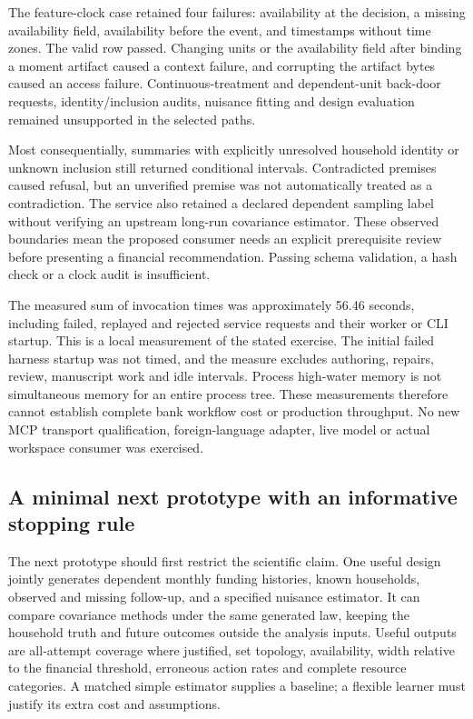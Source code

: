 The feature-clock case retained four failures: availability at the decision,
a missing availability field, availability before the event, and timestamps
without time zones. The valid row passed. Changing units or the availability
field after binding a moment artifact caused a context failure, and corrupting
the artifact bytes caused an access failure. Continuous-treatment and
dependent-unit back-door requests, identity/inclusion audits, nuisance fitting
and design evaluation remained unsupported in the selected paths.

Most consequentially, summaries with explicitly unresolved household identity
or unknown inclusion still returned conditional intervals. Contradicted
premises caused refusal, but an unverified premise was not automatically
treated as a contradiction. The service also retained a declared dependent
sampling label without verifying an upstream long-run covariance estimator.
These observed boundaries mean the proposed consumer needs an explicit
prerequisite review before presenting a financial recommendation. Passing
schema validation, a hash check or a clock audit is insufficient.

The measured sum of invocation times was approximately 56.46 seconds, including
failed, replayed and rejected service requests and their worker or CLI startup.
This is a local measurement of the stated exercise. The initial failed
harness startup was not timed, and the measure excludes authoring, repairs,
review, manuscript work and idle intervals. Process high-water memory is not
simultaneous memory for an entire process tree. These measurements therefore
cannot establish complete bank workflow cost or production throughput.
No new MCP transport qualification, foreign-language adapter, live model or
actual workspace consumer was exercised.

\subsection{A minimal next prototype with an informative stopping rule}

The next prototype should first restrict the scientific claim. One useful
design jointly generates dependent monthly funding histories, known
households, observed and missing follow-up, and a specified nuisance
estimator. It can compare covariance methods under the same generated law,
keeping the household truth and future outcomes outside the analysis inputs.
Useful outputs are all-attempt coverage where justified, set topology,
availability, width relative to the financial threshold, erroneous action
rates and complete resource categories. A matched simple estimator supplies
a baseline; a flexible learner must justify its extra cost and assumptions.

